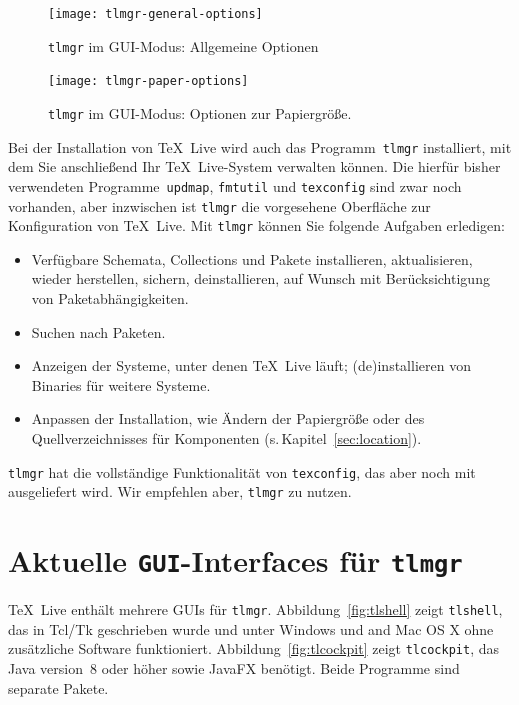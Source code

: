 \documentclass[12pt,ngerman,a4paper,fullparskip]{scrreprt}
\newcommand{\TL}{\TeX\ Live\xspace}
\newcommand{\cmdname}[1]{\texttt{#1}}
\newcommand{\prog}[1]{\texttt{#1}}
\begin{document}
\begin{figure}[h]
	\centering
    \texttt{[image: tlmgr-general-options]}
    \caption{\texttt{tlmgr} im GUI-Modus: Allgemeine Optionen}
    \label{fig:tlmgr-general-options}
\end{figure}

\begin{figure}[h]
\centering
\texttt{[image: tlmgr-paper-options]}
    \caption{\texttt{tlmgr} im GUI-Modus: Optionen zur Papiergröße.}
    \label{fig:tlmgr-paper-options}
\end{figure}

Bei der Installation von \TL wird auch das Programm~\prog{tlmgr} installiert, mit dem Sie anschließend Ihr \TL-System verwalten können. Die hierfür bisher verwendeten Programme~\prog{updmap}, \prog{fmtutil} und \prog{texconfig} sind zwar noch vorhanden, aber inzwischen ist \prog{tlmgr} die vorgesehene Oberfläche zur Konfiguration von \TL. Mit \prog{tlmgr} können Sie folgende Aufgaben erledigen:

\begin{itemize} %
\item Verfügbare Schemata, Collections und Pakete installieren, aktualisieren, wieder
     herstellen, sichern, deinstallieren, auf Wunsch mit Berücksichtigung von Paketabhängigkeiten.
\item Suchen nach Paketen.
\item Anzeigen der Systeme, unter denen \TL läuft; (de)installieren von Binaries für weitere Systeme.
\item Anpassen der Installation, wie Ändern der Papiergröße oder des Quellverzeichnisses für Komponenten
 (s.\,Kapitel~\ref{sec:location}).
\end{itemize}

\prog{tlmgr} hat die vollständige Funktionalität von \prog{texconfig}, das aber noch mit ausgeliefert wird. Wir empfehlen aber, \prog{tlmgr} zu nutzen.

\section{Aktuelle \texttt{GUI}-Interfaces für \cmdname{tlmgr}}

\TL{} enthält mehrere GUIs für \prog{tlmgr}. Abbildung~\ref{fig:tlshell} zeigt \cmdname{tlshell},
das in Tcl/Tk geschrieben wurde und unter Windows und 
and Mac OS X ohne zusätzliche Software funktioniert. Abbildung~\ref{fig:tlcockpit} zeigt \prog{tlcockpit}, das Java version~8 oder höher sowie JavaFX benötigt. Beide Programme sind separate Pakete.
\end{document}
